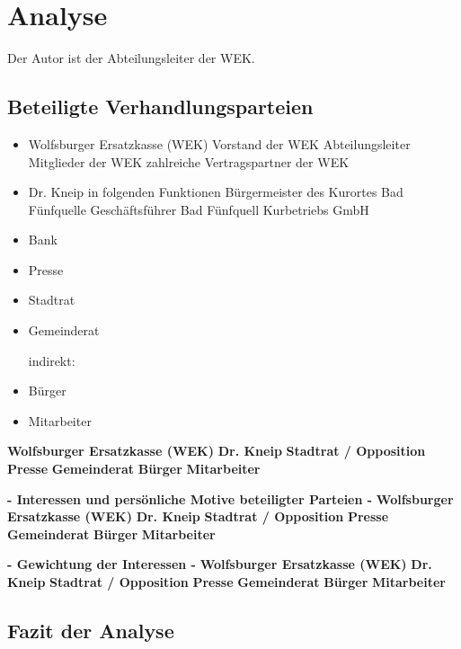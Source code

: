 \chapter{Analyse}
Der Autor ist der Abteilungsleiter der WEK.
\section{Beteiligte Verhandlungsparteien}
	
\begin{itemize}
	\item Wolfsburger Ersatzkasse (WEK)
    	\subitem Vorstand der WEK
    	\subitem Abteilungsleiter
		\subitem Mitglieder der WEK
		\subitem zahlreiche Vertragspartner der WEK
    
	\item Dr. Kneip in folgenden Funktionen
		\subitem Bürgermeister des Kurortes Bad Fünfquelle
		\subitem Geschäftsführer Bad Fünfquell Kurbetriebs GmbH
    
    \item Bank
    \item Presse
    \item Stadtrat
	\item Gemeinderat 
    
    indirekt:
	\item Bürger	
	\item Mitarbeiter
\end{itemize}

\textbf{Wolfsburger Ersatzkasse (WEK)} \smallskip
\textbf{Dr. Kneip} \smallskip
\textbf{Stadtrat / Opposition} \smallskip
\textbf{Presse} \smallskip
\textbf{Gemeinderat} \smallskip
\textbf{Bürger} \smallskip
\textbf{Mitarbeiter} \smallskip

\textbf{- Interessen und persönliche Motive beteiligter Parteien -} \smallskip
\textbf{Wolfsburger Ersatzkasse (WEK)} \smallskip
\textbf{Dr. Kneip} \smallskip
\textbf{Stadtrat / Opposition} \smallskip
\textbf{Presse} \smallskip
\textbf{Gemeinderat} \smallskip
\textbf{Bürger} \smallskip
\textbf{Mitarbeiter} \smallskip

\textbf{- Gewichtung der Interessen -} \smallskip
\textbf{Wolfsburger Ersatzkasse (WEK)} \smallskip
\textbf{Dr. Kneip} \smallskip
\textbf{Stadtrat / Opposition} \smallskip
\textbf{Presse} \smallskip
\textbf{Gemeinderat} \smallskip
\textbf{Bürger} \smallskip
\textbf{Mitarbeiter} \smallskip

\section{Fazit der Analyse}